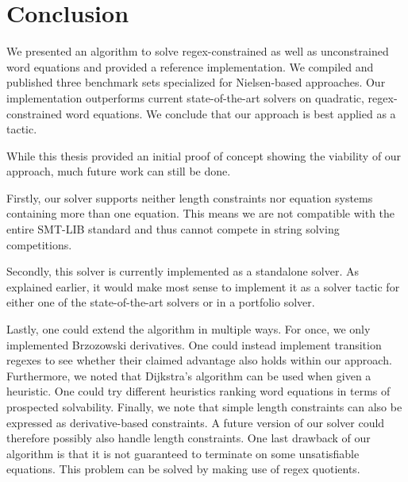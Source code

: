 \chapter{Conclusion} \label{ch_conclusion}

We presented an algorithm to solve regex-constrained as well as unconstrained word equations and provided a reference implementation. We compiled and published three benchmark sets specialized for Nielsen-based approaches. Our implementation outperforms current state-of-the-art solvers on quadratic, regex-constrained word equations. We conclude that our approach is best applied as a tactic.

While this thesis provided an initial proof of concept showing the viability of our approach, much future work can still be done.

Firstly, our solver supports neither length constraints nor equation systems containing more than one equation. This means we are not compatible with the entire SMT-LIB standard and thus cannot compete in string solving competitions.

Secondly, this solver is currently implemented as a standalone solver. As explained earlier, it would make most sense to implement it as a solver tactic for either one of the state-of-the-art solvers or in a portfolio solver.

Lastly, one could extend the algorithm in multiple ways.
For once, we only implemented Brzozowski derivatives. One could instead implement transition regexes to see whether their claimed advantage \cite{transition-regex} also holds within our approach. Furthermore, we noted that Dijkstra's algorithm can be used when given a heuristic. One could try different heuristics ranking word equations in terms of prospected solvability.
Finally, we note that simple length constraints can also be expressed as derivative-based constraints. A future version of our solver could therefore possibly also handle length constraints.
One last drawback of our algorithm is that it is not guaranteed to terminate on some unsatisfiable equations. This problem can be solved by making use of regex quotients.